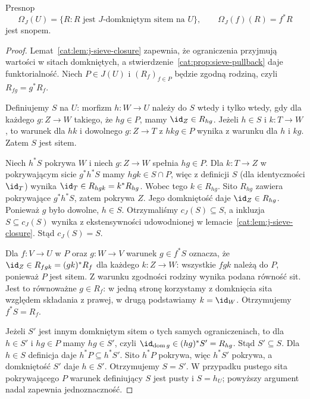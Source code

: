\begin{twierdzenie}\label{cat:thm:closed-sieves-sheaf}
Presnop
\[
 \Omega_J(U)=\{R:R\text{ jest }J\text{-domkniętym sitem na }U\},
 \qquad \Omega_J(f)(R)=f^*R
\]
jest snopem.
\end{twierdzenie}
\begin{proof}
Lemat~\ref{cat:lem:j-sieve-closure} zapewnia, że ograniczenia przyjmują wartości w sitach domkniętych, a stwierdzenie~\ref{cat:prop:sieve-pullback} daje funktorialność. Niech $P\in J(U)$ i $(R_f)_{f\in P}$ będzie zgodną rodziną, czyli $R_{fg}=g^*R_f$.

Definiujemy $S$ na $U$: morfizm $h:W\to U$ należy do $S$ wtedy i tylko wtedy, gdy dla każdego $g:Z\to W$ takiego, że $hg\in P$, mamy $\id_Z\in R_{hg}$. Jeżeli $h\in S$ i $k:T\to W$, to warunek dla $hk$ i dowolnego $g:Z\to T$ z $hkg\in P$ wynika z warunku dla $h$ i $kg$. Zatem $S$ jest sitem.

Niech $h^*S$ pokrywa $W$ i niech $g:Z\to W$ spełnia $hg\in P$. Dla $k:T\to Z$ w pokrywającym sicie $g^*h^*S$ mamy $hgk\in S\cap P$, więc z definicji $S$ (dla identyczności $\id_T$) wynika $\id_T\in R_{hgk}=k^*R_{hg}$. Wobec tego $k\in R_{hg}$. Sito $R_{hg}$ zawiera pokrywające $g^*h^*S$, zatem pokrywa $Z$. Jego domkniętość daje $\id_Z\in R_{hg}$. Ponieważ $g$ było dowolne, $h\in S$. Otrzymaliśmy $c_J(S)\subseteq S$, a inkluzja $S\subseteq c_J(S)$ wynika z ekstensywności udowodnionej w lemacie~\ref{cat:lem:j-sieve-closure}. Stąd $c_J(S)=S$.

Dla $f:V\to U$ w $P$ oraz $g:W\to V$ warunek $g\in f^*S$ oznacza, że $\id_Z\in R_{fgk}=(gk)^*R_f$ dla każdego $k:Z\to W$: wszystkie $fgk$ należą do $P$, ponieważ $P$ jest sitem. Z warunku zgodności rodziny wynika podana równość sit. Jest to równoważne $g\in R_f$: w jedną stronę korzystamy z domknięcia sita względem składania z prawej, w drugą podstawiamy $k=\id_W$. Otrzymujemy $f^*S=R_f$.

Jeżeli $S'$ jest innym domkniętym sitem o tych samych ograniczeniach, to dla $h\in S'$ i $hg\in P$ mamy $hg\in S'$, czyli $\id_{\operatorname{dom}g}\in (hg)^*S'=R_{hg}$. Stąd $S'\subseteq S$. Dla $h\in S$ definicja daje $h^*P\subseteq h^*S'$. Sito $h^*P$ pokrywa, więc $h^*S'$ pokrywa, a domkniętość $S'$ daje $h\in S'$. Otrzymujemy $S=S'$. W przypadku pustego sita pokrywającego $P$ warunek definiujący $S$ jest pusty i $S=h_U$; powyższy argument nadal zapewnia jednoznaczność.
\end{proof}

